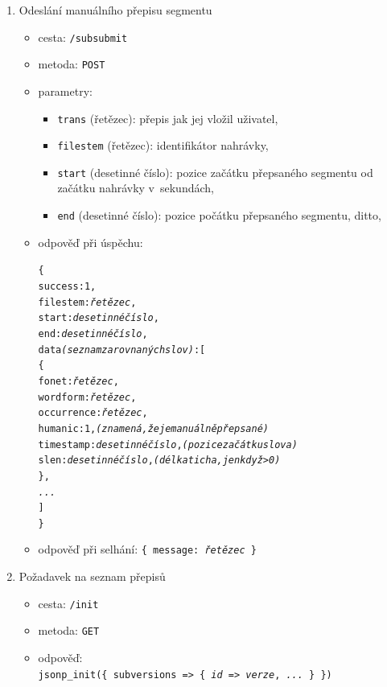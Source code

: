 \begin{enumerate}
\item{
    Odeslání manuálního přepisu segmentu
    \begin{itemize}
    \item{cesta: \texttt{/subsubmit}}
    \item{metoda: \texttt{POST}}
    \item{
        parametry:
        \begin{itemize}
            \item{\texttt{trans} (řetězec): přepis jak jej vložil uživatel,}
            \item{\texttt{filestem} (řetězec): identifikátor nahrávky,}
            \item{\texttt{start} (desetinné číslo): pozice začátku přepsaného segmentu od začátku nahrávky v~sekundách,}
            \item{\texttt{end} (desetinné číslo): pozice počátku přepsaného segmentu, ditto,}
        \end{itemize}
    }
    \item{
    odpověď při úspěchu: \begin{alltt}\{
  success: 1,
  filestem: {\em řetězec},
  start: {\em desetinné číslo},
  end: {\em desetinné číslo},
  data {\em (seznam zarovnaných slov)}: [ 
    \{
      fonet:{\em řetězec},
      wordform:{\em řetězec},
      occurrence:{\em řetězec},
      humanic: 1,{\em (znamená, že je manuálně přepsané)}
      timestamp:{\em desetinné číslo},{\em (pozice začátku slova)}
      slen:{\em desetinné číslo},{\em (délka ticha, jen když > 0)}
    \},
    {\em ...}
  ]
\}\end{alltt}
    }
    \item{odpověď při selhání: \texttt{\{ message: {\em řetězec} \}}}
    \end{itemize}
}
\item{
    Požadavek na seznam přepisů
    \begin{itemize}
      \item{cesta: \texttt{/init}}
      \item{metoda: \texttt{GET}}
      \item{
        odpověď:\\ \texttt{jsonp\_init(\{ subversions => \{ {\em id} => {\em verze}, {\em ...} \} \})}
      }
    \end{itemize}

}
\end{enumerate}
